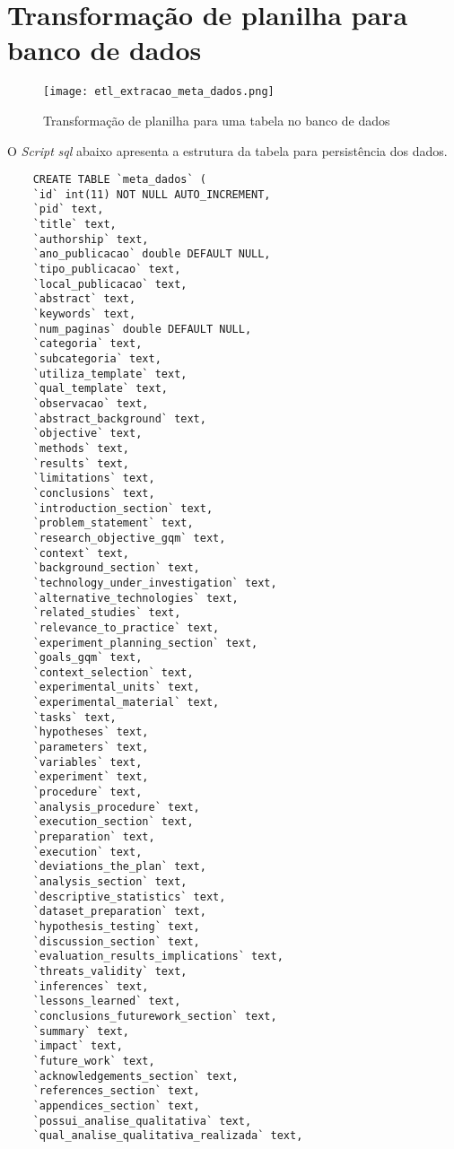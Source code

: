 \label{apen:a}


\section{Transformação de planilha para banco de dados}
\label{apen:a1}

\begin{figure}[htb]
	\centering					
	{\texttt{[image: etl\_extracao\_meta\_dados.png]}}
	
	\caption{Transformação de planilha para uma tabela no banco de dados}
	\label{fig:etl-meta-dados}
\end{figure}

O \textit{Script} \textit{sql} abaixo apresenta a estrutura da tabela para persistência dos dados.
\begin{scriptsize}
	\begin{verbatim}
	CREATE TABLE `meta_dados` (
	`id` int(11) NOT NULL AUTO_INCREMENT,
	`pid` text,
	`title` text,
	`authorship` text,
	`ano_publicacao` double DEFAULT NULL,
	`tipo_publicacao` text,
	`local_publicacao` text,
	`abstract` text,
	`keywords` text,
	`num_paginas` double DEFAULT NULL,
	`categoria` text,
	`subcategoria` text,
	`utiliza_template` text,
	`qual_template` text,
	`observacao` text,
	`abstract_background` text,
	`objective` text,
	`methods` text,
	`results` text,
	`limitations` text,
	`conclusions` text,
	`introduction_section` text,
	`problem_statement` text,
	`research_objective_gqm` text,
	`context` text,
	`background_section` text,
	`technology_under_investigation` text,
	`alternative_technologies` text,
	`related_studies` text,
	`relevance_to_practice` text,
	`experiment_planning_section` text,
	`goals_gqm` text,
	`context_selection` text,
	`experimental_units` text,
	`experimental_material` text,
	`tasks` text,
	`hypotheses` text,
	`parameters` text,
	`variables` text,
	`experiment` text,
	`procedure` text,
	`analysis_procedure` text,
	`execution_section` text,
	`preparation` text,
	`execution` text,
	`deviations_the_plan` text,
	`analysis_section` text,
	`descriptive_statistics` text,
	`dataset_preparation` text,
	`hypothesis_testing` text,
	`discussion_section` text,
	`evaluation_results_implications` text,
	`threats_validity` text,
	`inferences` text,
	`lessons_learned` text,
	`conclusions_futurework_section` text,
	`summary` text,
	`impact` text,
	`future_work` text,
	`acknowledgements_section` text,
	`references_section` text,
	`appendices_section` text,
	`possui_analise_qualitativa` text,
	`qual_analise_qualitativa_realizada` text,

\end{verbatim}
\end{scriptsize}
